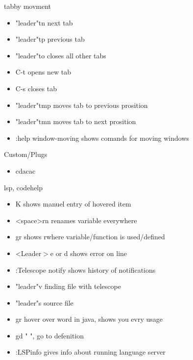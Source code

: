 \documentclass[12pt]{article}
\begin{document}
tabby movment 
\begin{itemize}
    \item "leader"tn next tab
    \item "leader"tp previous tab
    \item "leader"to closes all other tabs
    \item C-t opens new tab
    \item C-s closes tab 
    \item "leader"tmp moves tab to previous prosition
    \item "leader"tmn moves tab to next prosition
    \item :help window-moving shows comands for moving windows 
\end{itemize}

Custom/Plugs
\begin{itemize}

    \item  cdacac

\end{itemize}

lsp, codehelp
\begin{itemize}

    \item K shows manuel entry of hovered item
    \item <space>rn renames variable everywhere
    \item gr shows rwhere variable/function is used/defined
    \item <Leader$>$e or d shows error on line
    \item :Telescope notify shows history of notifications 
    \item "leader"v finding file with telescope
    \item "leader"s source file
    \item gr hover over word in java, shows you evry usage
    \item gd "  ", go to defenition
    \item :LSPinfo gives info about running language server 

\end{itemize}
\end{document}
